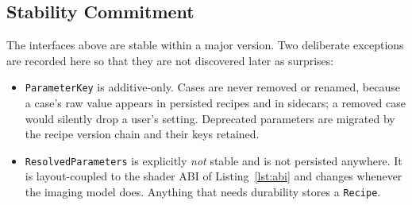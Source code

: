\subsection{Stability Commitment}

The interfaces above are stable within a major version. Two deliberate
exceptions are recorded here so that they are not discovered later as
surprises:

\begin{itemize}
\item \texttt{ParameterKey} is additive-only. Cases are never removed or
renamed, because a case's raw value appears in persisted recipes and in
sidecars; a removed case would silently drop a user's setting. Deprecated
parameters are migrated by the recipe version chain and their keys retained.
\item \texttt{ResolvedParameters} is explicitly \emph{not} stable and is not
persisted anywhere. It is layout-coupled to the shader ABI of
Listing~\ref{lst:abi} and changes whenever the imaging model does. Anything
that needs durability stores a \texttt{Recipe}.
\end{itemize}
